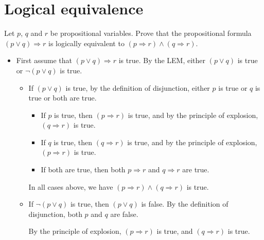 \section{Logical equivalence}


\begin{exercise}
\label{exPAndQImpliesRIffPImpliesRAndQImpliesR}
Let $p$, $q$ and $r$ be propositional variables. Prove that the propositional formula $(p \vee q) \Rightarrow r$ is logically equivalent to $(p \Rightarrow r) \wedge (q \Rightarrow r)$.
\end{exercise}

\begin{solutions*}
    \fixlistskip
    \begin{itemize}
        \item First assume that $(p \vee q) \Rightarrow r$ is true. By the LEM, either $(p \vee q)$ is true or $\neg (p \vee q)$ is true.
        \begin{itemize}
            \item If $(p \vee q)$ is true, by the definition of disjunction, either $p$ is true or $q$ is true or both are true.
            \begin{itemize}
                \item If $p$ is true, then $(p \Rightarrow r)$ is true, and by the principle of explosion, $(q \Rightarrow r)$ is true.
                \item If $q$ is true, then $(q \Rightarrow r)$ is true, and by the principle of explosion, $(p \Rightarrow r)$ is true.
                \item If both are true, then both $p \Rightarrow r$ and $q \Rightarrow r$ are true.
            \end{itemize}
            In all cases above, we have $(p \Rightarrow r) \wedge (q \Rightarrow r)$ is true.
            \item If $\neg (p \vee q)$ is true, then $(p \vee q)$ is false. By the definition of disjunction, both $p$ and $q$ are false.
            
            By the principle of explosion, $(p \Rightarrow r)$ is true, and $(q \Rightarrow r)$ is true.


\end{itemize}
\end{itemize}
\end{solutions*}
